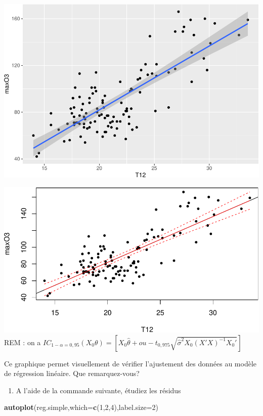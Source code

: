 \documentclass[
]{article}
\newenvironment{Shaded}{\begin{snugshade}}{\end{snugshade}}
\newcommand{\AttributeTok}[1]{\textcolor[rgb]{0.13,0.29,0.53}{#1}}
\newcommand{\DecValTok}[1]{\textcolor[rgb]{0.00,0.00,0.81}{#1}}
\newcommand{\FunctionTok}[1]{\textcolor[rgb]{0.13,0.29,0.53}{\textbf{#1}}}
\newcommand{\NormalTok}[1]{#1}
\providecommand{\tightlist}{%
  \setlength{\itemsep}{0pt}\setlength{\parskip}{0pt}}
\begin{document}
\includegraphics{TP-ML-Regression_files/figure-latex/unnamed-chunk-11-1.pdf}

\includegraphics{TP-ML-Regression_files/figure-latex/unnamed-chunk-12-1.pdf}
REM : on a
\(IC_{1 - \alpha = 0,95}(X_0\theta) = [X_0\hat{\theta} + ou - t_{0,975}\sqrt{\hat{\sigma}^{2}X_0(X'X)^{-1}X_0'}]\)

Ce graphique permet visuellement de vérifier l'ajustement des données au
modèle de régression linéaire. Que remarquez-vous?

\begin{enumerate}
\def\labelenumi{\arabic{enumi}.}
\setcounter{enumi}{3}
\tightlist
\item
  A l'aide de la commande suivante, étudiez les résidus
\end{enumerate}

\begin{Shaded}
\begin{Highlighting}[]
\FunctionTok{autoplot}\NormalTok{(reg.simple,}\AttributeTok{which=}\FunctionTok{c}\NormalTok{(}\DecValTok{1}\NormalTok{,}\DecValTok{2}\NormalTok{,}\DecValTok{4}\NormalTok{),}\AttributeTok{label.size=}\DecValTok{2}\NormalTok{)     }
\end{Highlighting}
\end{Shaded}
\end{document}
